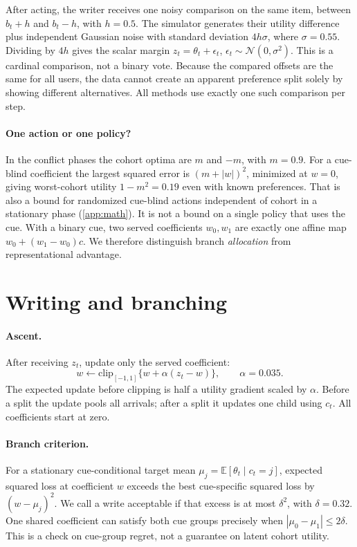 \documentclass[11pt]{article}
\newcommand{\E}{\mathbb{E}}
\begin{document}
After acting, the writer receives one noisy comparison on the same item, between \(b_t+h\) and \(b_t-h\), with \(h=0.5\). The simulator generates their utility difference plus independent Gaussian noise with standard deviation \(4h\sigma\), where \(\sigma=0.55\). Dividing by \(4h\) gives the scalar margin \(z_t=\theta_t+\epsilon_t\), \(\epsilon_t\sim\mathcal{N}(0,\sigma^2)\). This is a cardinal comparison, not a binary vote. Because the compared offsets are the same for all users, the data cannot create an apparent preference split solely by showing different alternatives. All methods use exactly one such comparison per step.

\paragraph{One action or one policy?}
In the conflict phases the cohort optima are \(m\) and \(-m\), with \(m=0.9\). For a cue-blind coefficient the largest squared error is \((m+|w|)^2\), minimized at \(w=0\), giving worst-cohort utility \(1-m^2=0.19\) even with known preferences. That is also a bound for randomized cue-blind actions independent of cohort in a stationary phase (\cref{app:math}). It is not a bound on a single policy that uses the cue. With a binary cue, two served coefficients \(w_0,w_1\) are exactly one affine map \(w_0+(w_1-w_0)c\). We therefore distinguish branch \emph{allocation} from representational advantage.

\section{Writing and branching}
\label{sec:method}
\paragraph{Ascent.}
After receiving \(z_t\), update only the served coefficient:
\begin{equation}
 w \leftarrow \mathrm{clip}_{[-1,1]}\{ w+\alpha(z_t-w)\},\qquad \alpha=0.035 .
 \label{eq:ascent}
\end{equation}
The expected update before clipping is half a utility gradient scaled by \(\alpha\). Before a split the update pools all arrivals; after a split it updates one child using \(c_t\). All coefficients start at zero.

\paragraph{Branch criterion.}
For a stationary cue-conditional target mean \(\mu_j=\E[\theta_t\mid c_t=j]\), expected squared loss at coefficient \(w\) exceeds the best cue-specific squared loss by \((w-\mu_j)^2\). We call a write acceptable if that excess is at most \(\delta^2\), with \(\delta=0.32\). One shared coefficient can satisfy both cue groups precisely when \(|\mu_0-\mu_1|\le 2\delta\). This is a check on cue-group regret, not a guarantee on latent cohort utility.
\end{document}

